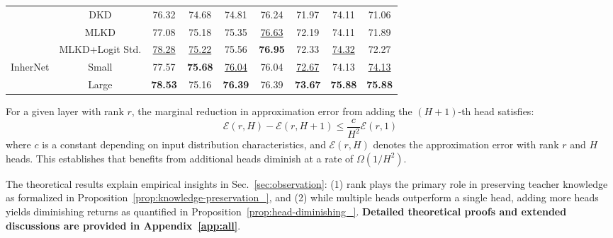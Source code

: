 \documentclass{article} %
\begin{document}
\begin{table}[th!]
{\begin{tabular}{@{}c|c|ccccccc@{}}
                          & DKD                      & 76.32              & 74.68 & 74.81    & 76.24    & 71.97    & 74.11     & 71.06     \\
                          & MLKD                     & 77.08              & 75.18 & 75.35    & \underline{76.63}    & 72.19    & 74.11     & 71.89     \\
                          & MLKD+Logit Std.          & \underline{78.28}
                          & \underline{75.22} & 75.56    & \textbf{76.95}    & 72.33    & \underline{74.32}     & 72.27     \\ \midrule
\multirow{2}{*}{InherNet} & Small                    & 77.57              & \textbf{75.68} & \underline{76.04}    & 76.04    & \underline{72.67}    & 74.13     & \underline{74.13}     \\ \cmidrule(l){2-9} 
                          & Large                    & \textbf{78.53}              & 75.16 & \textbf{76.39}    & 76.39    & \textbf{73.67}    & \textbf{75.88}     & \textbf{75.88}     \\ \bottomrule[1.3pt]
\end{tabular}%
}

\vspace{-0.5cm}
\end{table}

\begin{proposition}\label{prop:head-diminishing_}
For a given layer with rank $r$, the marginal reduction in approximation error from adding the $(H+1)$-th head satisfies:
\begin{equation}
\mathcal{E}(r,H) - \mathcal{E}(r,H+1) \leq \frac{c}{H^2}\mathcal{E}(r,1)
\end{equation}
where $c$ is a constant depending on input distribution characteristics, and $\mathcal{E}(r,H)$ denotes the approximation error with rank $r$ and $H$ heads. This establishes that benefits from additional heads diminish at a rate of $\Omega(1/H^2)$.
\end{proposition}

The theoretical results explain empirical insights in Sec.~\ref{sec:observation}: (1) rank plays the primary role in preserving teacher knowledge as formalized in Proposition~\ref{prop:knowledge-preservation_}, and (2) while multiple heads outperform a single head, adding more heads yields diminishing returns as quantified in Proposition~\ref{prop:head-diminishing_}. \textbf{Detailed theoretical proofs and extended discussions are provided in Appendix~\ref{app:all}}.
\end{document}
